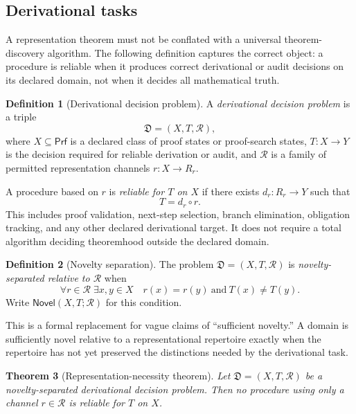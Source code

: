 \documentclass[11pt]{article}
\newcommand{\Prf}{\mathsf{Prf}}
\newcommand{\Novel}{\mathsf{Novel}}
\theoremstyle{plain}
\newtheorem{theorem}{Theorem}[section]
\theoremstyle{definition}
\newtheorem{definition}[theorem]{Definition}
\theoremstyle{remark}
\begin{document}
\subsection{Derivational tasks}

A representation theorem must not be conflated with a universal theorem-discovery algorithm.  The following definition captures the correct object: a procedure is reliable when it produces correct derivational or audit decisions on its declared domain, not when it decides all mathematical truth.

\begin{definition}[Derivational decision problem]
\label{def:derivproblem}
A \emph{derivational decision problem} is a triple
\[
  \mathfrak D=(X,T,\mathcal R),
\]
where $X\subseteq\Prf$ is a declared class of proof states or proof-search states, $T:X\to Y$ is the decision required for reliable derivation or audit, and $\mathcal R$ is a family of permitted representation channels $r:X\to R_r$.

A procedure based on $r$ is \emph{reliable for $T$ on $X$} if there exists $d_r:R_r\to Y$ such that
\[
  T=d_r\circ r.
\]
This includes proof validation, next-step selection, branch elimination, obligation tracking, and any other declared derivational target.  It does not require a total algorithm deciding theoremhood outside the declared domain.
\end{definition}

\begin{definition}[Novelty separation]
\label{def:novelty}
The problem $\mathfrak D=(X,T,\mathcal R)$ is \emph{novelty-separated relative to $\mathcal R$} when
\[
  \forall r\in\mathcal R\;\exists x,y\in X
  \quad r(x)=r(y)\ \text{and}\ T(x)\neq T(y).
\]
Write $\Novel(X,T;\mathcal R)$ for this condition.
\end{definition}

This is a formal replacement for vague claims of ``sufficient novelty.''  A domain is sufficiently novel relative to a representational repertoire exactly when the repertoire has not yet preserved the distinctions needed by the derivational task.

\begin{theorem}[Representation-necessity theorem]
\label{thm:necessity}
Let $\mathfrak D=(X,T,\mathcal R)$ be a novelty-separated derivational decision problem.  Then no procedure using only a channel $r\in\mathcal R$ is reliable for $T$ on $X$.
\end{theorem}
\end{document}
